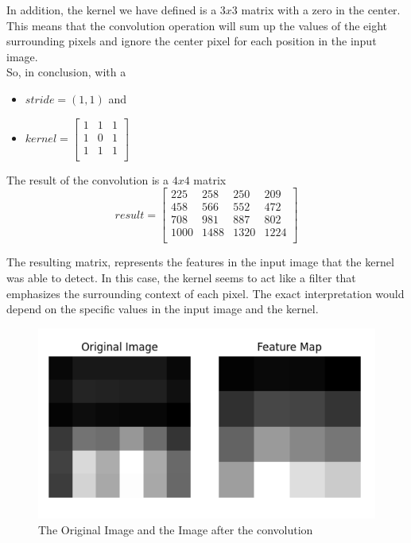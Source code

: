 In addition, the kernel we have defined is a $3 x 3$ matrix with a zero in the center. This means that the convolution operation will sum up the values of the eight surrounding pixels and ignore the center pixel for each position in the input image.\\

So, in conclusion, with a
\begin{itemize}
	\item $stride = \left(1,1\right)$ and 
	\item $	kernel = \begin{bmatrix}
		1 & 1 & 1  \\
		1 & 0 & 1  \\
		1 & 1 & 1  \\
	\end{bmatrix}$
\end{itemize}

The result of the convolution is a $ 4 x 4$ matrix\\

\begin{equation}
	result = \begin{bmatrix}
		225 & 258 & 250 & 209  \\
		458 & 566 & 552 & 472  \\
		708 & 981 & 887 & 802  \\
		1000 & 1488 & 1320 &1224 \\
	\end{bmatrix}
\end{equation}
\vspace{6mm}

The resulting matrix, represents the features in the input image that the kernel was able to detect. In this case, the kernel seems to act like a filter that emphasizes the surrounding context of each pixel. The exact interpretation would depend on the specific values in the input image and the kernel. 

\begin{figure}[H]
	\centering
	\includegraphics[width=.7\textwidth]{../Problem 11/conv_result.pdf}
	\caption{The Original Image and the Image after the convolution}
\end{figure}
\vspace{3mm}
